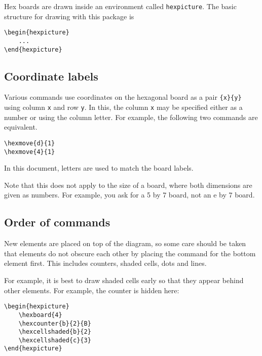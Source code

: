 \documentclass[a4paper,12pt]{article}
\begin{document}
    Hex boards are drawn inside an environment called \verb|hexpicture|. The basic structure for drawing with this package is 
    
    \begin{verbatim}\begin{hexpicture}
    ...
\end{hexpicture}\end{verbatim}
    
    \subsection{Coordinate labels}
    
    Various commands use coordinates on the hexagonal board as a pair \verb|{x}{y}| using column \verb|x| and row \verb|y|. In this, the column \verb|x| may be specified either as a number or using the column letter. For example, the following two commands are equivalent. 
    
    \begin{verbatim}\hexmove{d}{1}
\hexmove{4}{1}\end{verbatim}
    
    In this document, letters are used to match the board labels.
    
    Note that this does not apply to the size of a board, where both dimensions are given as numbers. For example, you ask for a 5 by 7 board, not an e by 7 board.
    
    \subsection{Order of commands}

    New elements are placed on top of the diagram, so some care should be taken that elements do not obscure each other by placing the command for the bottom element first. This includes counters, shaded cells, dots and lines.
    
    For example, it is best to draw shaded cells early so that they appear behind other elements. For example, the counter is hidden here:

    \begin{verbatim}\begin{hexpicture}
    \hexboard{4}
    \hexcounter{b}{2}{B}
    \hexcellshaded{b}{2}
    \hexcellshaded{c}{3}
\end{hexpicture}\end{verbatim}

    \begin{hexpicture}
    \end{hexpicture}
    
\end{document}
